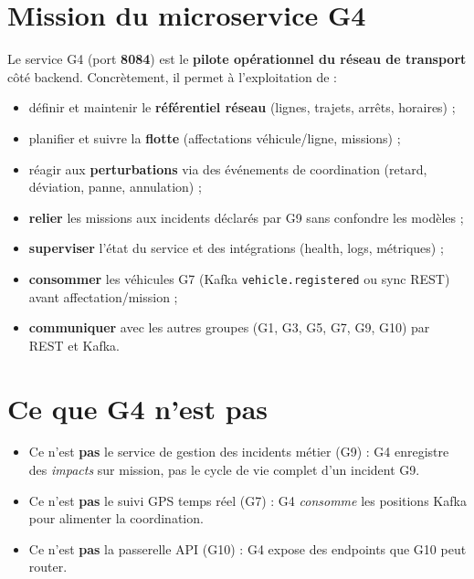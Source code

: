 \documentclass[12pt,a4paper]{report}
\begin{document}
\section{Mission du microservice G4}
Le service G4 (port \textbf{8084}) est le \textbf{pilote opérationnel du réseau de transport} côté backend. Concrètement, il permet à l'exploitation de :
\begin{itemize}[leftmargin=*]
    \item définir et maintenir le \textbf{référentiel réseau} (lignes, trajets, arrêts, horaires) ;
    \item planifier et suivre la \textbf{flotte} (affectations véhicule/ligne, missions) ;
    \item réagir aux \textbf{perturbations} via des événements de coordination (retard, déviation, panne, annulation) ;
    \item \textbf{relier} les missions aux incidents déclarés par G9 sans confondre les modèles ;
    \item \textbf{superviser} l'état du service et des intégrations (health, logs, métriques) ;
    \item \textbf{consommer} les véhicules G7 (Kafka \texttt{vehicle.registered} ou sync REST) avant affectation/mission ;
    \item \textbf{communiquer} avec les autres groupes (G1, G3, G5, G7, G9, G10) par REST et Kafka.
\end{itemize}

\section{Ce que G4 n'est pas}
\begin{itemize}[leftmargin=*]
    \item Ce n'est \textbf{pas} le service de gestion des incidents métier (G9) : G4 enregistre des \textit{impacts} sur mission, pas le cycle de vie complet d'un incident G9.
    \item Ce n'est \textbf{pas} le suivi GPS temps réel (G7) : G4 \textit{consomme} les positions Kafka pour alimenter la coordination.
    \item Ce n'est \textbf{pas} la passerelle API (G10) : G4 expose des endpoints que G10 peut router.
\end{itemize}
\end{document}
